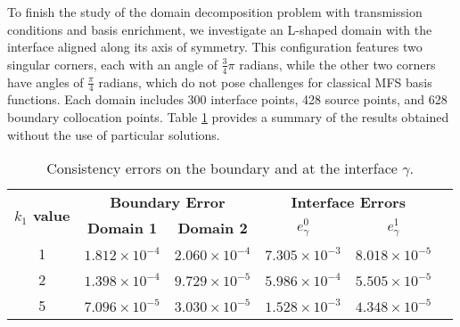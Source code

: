 \documentclass[5p,authoryear]{elsarticle}
\begin{document}
To finish the study of the domain decomposition problem with transmission conditions and basis enrichment, we investigate an L-shaped domain with the interface aligned along its axis of symmetry. This configuration features two singular corners, each with an angle of \(\frac{3}{4}\pi\) radians, while the other two corners have angles of \(\frac{\pi}{4}\) radians, which do not pose challenges for classical MFS basis functions. Each domain includes 300 interface points, 428 source points, and 628 boundary collocation points. Table \ref{tab:transmission_results_L_shape_axis} provides a summary of the results obtained without the use of particular solutions.

\begin{table}
    \centering
    \footnotesize %
    \setlength{\tabcolsep}{1pt} %
    \begin{tabular}{cccccc}
        \toprule
        \multirow{2}{*}{\textbf{\(k_1\) value}} & \multicolumn{2}{c}{\textbf{Boundary Error}} & \multicolumn{2}{c}{\textbf{Interface Errors}} \\
        \cmidrule(lr){2-3} \cmidrule(lr){4-5}
        & \textbf{Domain 1} & \textbf{Domain 2} & \textbf{\(e_\gamma^0\)} & \textbf{\(e_\gamma^1\)} \\
        \midrule
        1 & $1.812\times10^{-4}$ & $2.060\times10^{-4}$ & $7.305\times10^{-3}$ & $8.018\times10^{-5}$ \\
        2 & $1.398\times10^{-4}$ & $9.729\times10^{-5}$ & $5.986\times10^{-4}$ & $5.505\times10^{-5}$ \\
        5 & $7.096\times10^{-5}$ & $3.030\times10^{-5}$ & $1.528\times10^{-3}$ & $4.348\times10^{-5}$ \\
        \bottomrule
    \end{tabular}
    \caption{Consistency errors on the boundary and at the interface \(\gamma\).}
    \label{tab:transmission_results_L_shape_axis}
\end{table}
\end{document}
